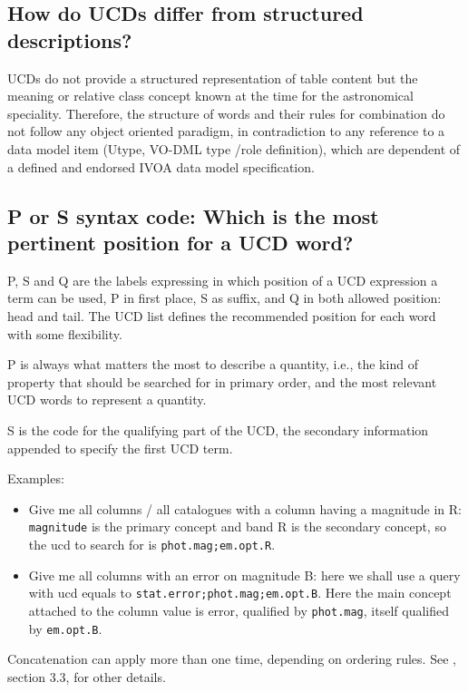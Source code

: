\documentclass[11pt,a4paper]{ivoa}
\begin{document}
\subsection{How do UCDs differ from structured descriptions?}

UCDs do not provide a structured representation of table content but the meaning or relative class 
concept known at the time for the astronomical speciality. Therefore, the structure of words and 
their rules for combination do not follow any object oriented paradigm, in contradiction to any 
reference to a data model item (Utype, VO-DML type /role definition), which are dependent of a 
defined and endorsed IVOA data model specification.

\subsection{P or S syntax code: Which is the most pertinent position for a UCD word?}
P, S and Q are the labels expressing in which position of a UCD expression a term can be used, P 
in first place, S as suffix, and Q in both allowed position: head and tail. The UCD list defines 
the recommended position for each word with some flexibility.

P is always what matters the most to describe a quantity, i.e., the kind of property that should be 
searched for in primary order, and the most relevant UCD words to represent a quantity.

S is the code for the qualifying part of the UCD, the secondary information appended to specify 
the first UCD term.

Examples:
\begin{itemize}
\item Give me all columns / all catalogues with a column having a magnitude in R: {\tt magnitude} 
is the primary concept and band R is the secondary concept, so the ucd to search for is 
{\tt phot.mag;em.opt.R}.
\item Give me all columns with an error on magnitude B: here we shall use a query with ucd 
equals to {\tt stat.error;phot.mag;em.opt.B}. Here the main concept attached to the column 
value is error, qualified by {\tt phot.mag}, itself qualified by {\tt em.opt.B}.
\end{itemize}
Concatenation can apply more than one time, depending on ordering rules. See \citet{std:UCD}, section 3.3, 
for other details.
\end{document}
